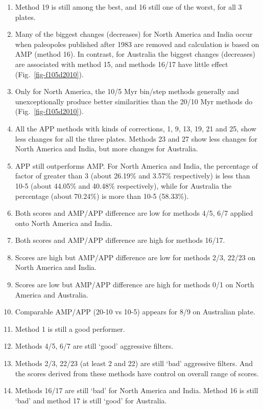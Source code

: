 \begin{enumerate}
  \item Method 19 is still among the best, and 16 still one of the worst, for
		all 3 plates.
  \item Many of the biggest changes (decreases) for North America and India
		occur when paleopoles published after 1983 are removed and calculation
		is based on AMP (method 16). In contrast, for Australia the biggest
		changes (decreases) are associated with method 15, and methods 16/17
		have little effect (Fig.~\ref{fig-f105d2010}).
  \item Only for North America, the 10/5 Myr bin/step methods generally and
		unexceptionally produce better similarities than the 20/10 Myr methods
		do (Fig.~\ref{fig-f105d2010}).
  \item All the APP methods with kinds of corrections, 1, 9, 13, 19, 21 and 25,
		show less changes for all the three plates. Methods 23 and 27 show less
		changes for North America and India, but more changes for Australia.
  \item APP still outperforms AMP\@. For North America and India, the percentage
		of factor of greater than 3 (about 26.19\% and 3.57\% respectively) is
		less than 10-5 (about 44.05\% and 40.48\% respectively), while for
		Australia the percentage (about 70.24\%) is more than 10-5 (58.33\%).
  \item Both scores and AMP/APP difference are low for methods 4/5, 6/7 applied
		onto North America and India.
  \item Both scores and AMP/APP difference are high for methods 16/17.
  \item Scores are high but AMP/APP difference are low for methods 2/3, 22/23
		on North America and India.
  \item Scores are low but AMP/APP difference are high for methods 0/1 on North
		America and Australia.
  \item Comparable AMP/APP (20-10 vs 10-5) appears for 8/9 on Australian plate.
  \item Method 1 is still a good performer.
  \item Methods 4/5, 6/7 are still `good' aggressive filters.
  \item Methods 2/3, 22/23 (at least 2 and 22) are still `bad' aggressive
		filters. And the scores derived from these methods have control on
		overall range of scores.
  \item Methods 16/17 are still `bad' for North America and India. Method 16 is
		still `bad' and method 17 is still `good' for Australia.
\end{enumerate}


